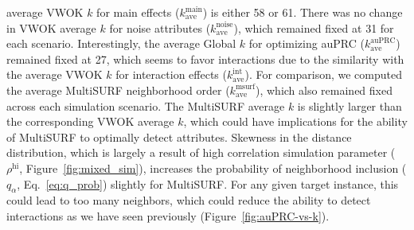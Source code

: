 \documentclass[10pt,letterpaper]{article}
\begin{document}
average VWOK $k$ for main effects ($k^\text{main}_\text{ave}$) is either 58 or 61. There was no change in VWOK average $k$ for noise attributes ($k^\text{noise}_\text{ave}$), which remained fixed at 31 for each scenario. Interestingly, the average Global $k$ for optimizing auPRC ($k^\text{auPRC}_\text{ave}$) remained fixed at 27, which seems to favor interactions due to the similarity with the average VWOK $k$ for interaction effects ($k^\text{int}_\text{ave}$). For comparison, we computed the average MultiSURF neighborhood order ($k^\text{msurf}_\text{ave}$), which also remained fixed across each simulation scenario. The MultiSURF average $k$ is slightly larger than the corresponding VWOK average $k$, which could have implications for the ability of MultiSURF to optimally detect attributes. Skewness in the distance distribution, which is largely a result of high correlation simulation parameter ($\rho^\text{hi}$, Figure~\ref{fig:mixed_sim}), increases the probability of neighborhood inclusion ($q_\alpha$, Eq.~\ref{eq:q_prob}) slightly for MultiSURF. For any given target instance, this could lead to too many neighbors, which could reduce the ability to detect interactions as we have seen previously (Figure~\ref{fig:auPRC-vs-k}).
\end{document}

